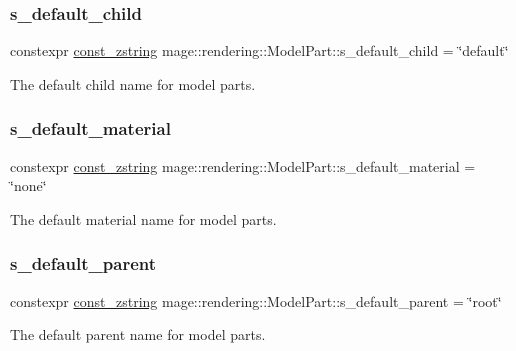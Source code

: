 \subsubsection{\texorpdfstring{s\+\_\+default\+\_\+child}{s\_default\_child}}
{\footnotesize\ttfamily constexpr \mbox{\hyperlink{namespacemage_abfd9206dc607ceb5d13ec68bf075a5c0}{const\+\_\+zstring}} mage\+::rendering\+::\+Model\+Part\+::s\+\_\+default\+\_\+child = \char`\"{}default\char`\"{}\hspace{0.3cm}{\ttfamily [static]}}

The default child name for model parts. \mbox{\label{structmage_1_1rendering_1_1_model_part_a833762db3fb81dd2086e9b89da158b12}} 
\subsubsection{\texorpdfstring{s\+\_\+default\+\_\+material}{s\_default\_material}}
{\footnotesize\ttfamily constexpr \mbox{\hyperlink{namespacemage_abfd9206dc607ceb5d13ec68bf075a5c0}{const\+\_\+zstring}} mage\+::rendering\+::\+Model\+Part\+::s\+\_\+default\+\_\+material = \char`\"{}none\char`\"{}\hspace{0.3cm}{\ttfamily [static]}}

The default material name for model parts. \mbox{\label{structmage_1_1rendering_1_1_model_part_ab6747ba3fd20c9f55f1d9bb7a64033e5}} 
\subsubsection{\texorpdfstring{s\+\_\+default\+\_\+parent}{s\_default\_parent}}
{\footnotesize\ttfamily constexpr \mbox{\hyperlink{namespacemage_abfd9206dc607ceb5d13ec68bf075a5c0}{const\+\_\+zstring}} mage\+::rendering\+::\+Model\+Part\+::s\+\_\+default\+\_\+parent = \char`\"{}root\char`\"{}\hspace{0.3cm}{\ttfamily [static]}}

The default parent name for model parts. 